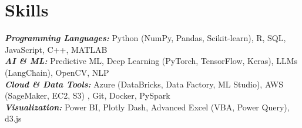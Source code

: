 \documentclass[letter paper,11pt]{article}
\makeatletter
\newcommand{\resumeItem}[1]{
\justifying
\vspace{-2.4px}
  \item\small{
    {#1}
  }
}
\newcommand{\resumeSubheading}[5]{%
  \item
    \begin{tabular*}
    {1\textwidth}
    {l@{\extracolsep{\fill}}r}
      \textbf{#1} & \small#2 \\
      {\small#3} & {\small #4} \\
      {\small#5}
    \end{tabular*}%
  \vspace{-0.95cm}
}
\newcommand{\resumeSubHeadingListStart}{\begin{itemize}[leftmargin=0.0in, label={}]}
\newcommand{\resumeItemListStart}{\vspace{1pt}\begin{itemize}}
\makeatother
\begin{document}
\section{\large{Skills}}
 \begin{itemize}[leftmargin=0.00in, label={}]
    \small{\item{
     \textbf{\textsl{Programming Languages:}}{ Python (NumPy, Pandas, Scikit-learn), R, SQL, JavaScript, C++, MATLAB} \\

     \textbf{\textsl{AI \& ML:}}
     { Predictive ML, Deep Learning (PyTorch, TensorFlow, Keras), LLMs (LangChain), OpenCV, NLP  } \\
     
     \textbf{\textsl{Cloud \& Data Tools:}}\small{ Azure (DataBricks, Data Factory, ML Studio), AWS (SageMaker, EC2, S3) , Git, Docker, PySpark}\\
     
     \textbf{\textsl{Visualization:}}\small{ Power BI, Plotly Dash, Advanced Excel (VBA, Power Query), d3.js} \
    }}
 \end{itemize}
 



\end{document}
